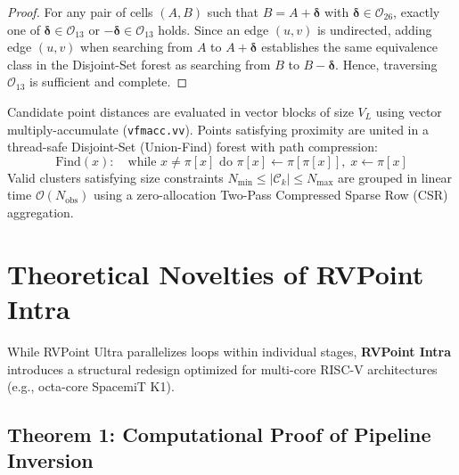 \documentclass[journal,compsoc]{IEEEtran}
\begin{document}
\begin{proof}
For any pair of cells $(A, B)$ such that $B = A + \bm{\delta}$ with $\bm{\delta} \in \mathcal{O}_{26}$, exactly one of $\bm{\delta} \in \mathcal{O}_{13}$ or $-\bm{\delta} \in \mathcal{O}_{13}$ holds. Since an edge $(u, v)$ is undirected, adding edge $(u, v)$ when searching from $A$ to $A + \bm{\delta}$ establishes the same equivalence class in the Disjoint-Set forest as searching from $B$ to $B - \bm{\delta}$. Hence, traversing $\mathcal{O}_{13}$ is sufficient and complete.
\end{proof}

Candidate point distances are evaluated in vector blocks of size $V_L$ using vector multiply-accumulate (\texttt{vfmacc.vv}). Points satisfying proximity are united in a thread-safe Disjoint-Set (Union-Find) forest with path compression:
\begin{equation}
\text{Find}(x): \quad \text{while } x \neq \pi[x] \text{ do } \pi[x] \leftarrow \pi[\pi[x]], \; x \leftarrow \pi[x]
\end{equation}
Valid clusters satisfying size constraints $N_{\min} \le |\mathcal{C}_k| \le N_{\max}$ are grouped in linear time $\mathcal{O}(N_{\text{obs}})$ using a zero-allocation Two-Pass Compressed Sparse Row (CSR) aggregation.

\section{Theoretical Novelties of RVPoint Intra}
\label{sec:intra_theory}

While RVPoint Ultra parallelizes loops within individual stages, \textbf{RVPoint Intra} introduces a structural redesign optimized for multi-core RISC-V architectures (e.g., octa-core SpacemiT K1).

\subsection{Theorem 1: Computational Proof of Pipeline Inversion}
\label{sec:theorem_inversion}
\end{document}
